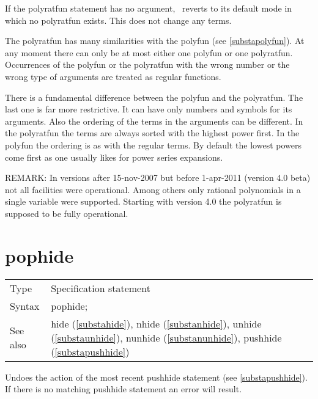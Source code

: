 \noindent If the polyratfun statement has no argument, \FORM\ reverts to its 
default mode in which no polyratfun exists. This does not change any terms.

\noindent The polyratfun has many similarities with the polyfun (see 
\ref{substapolyfun}). At any moment there can only be at most either one 
polyfun or one polyratfun. Occurrences of the polyfun or the polyratfun 
with the wrong number or the wrong type of arguments are treated as regular 
functions.

\noindent There is a fundamental difference between the polyfun and the 
polyratfun. The last one is far more restrictive. It can have only numbers 
and symbols for its arguments. Also the ordering of the terms in the 
arguments can be different. In the polyratfun the terms are always sorted 
with the highest power first. In the polyfun the ordering is as with the 
regular terms. By default the lowest powers come first as one usually likes 
for power series expansions.

\noindent REMARK: In versions after 15-nov-2007 but before 1-apr-2011 
(version 4.0 beta) not all facilities were operational. Among others only 
rational polynomials in a single variable were supported. Starting with 
version 4.0 the polyratfun is supposed to be fully operational.
\vspace{10mm}


\section{pophide}
\label{substapophide}

\noindent \begin{tabular}{ll}
Type & Specification statement\\
Syntax & pophide;
\\ See also & hide (\ref{substahide}),
              nhide (\ref{substanhide}),
              unhide (\ref{substaunhide}),
              nunhide (\ref{substanunhide}),
              pushhide (\ref{substapushhide})
\end{tabular} \vspace{4mm}

\noindent Undoes the action of the most recent 
pushhide statement (see \ref{substapushhide}). If there is 
no matching pushhide statement an error will result. \vspace{10mm}


